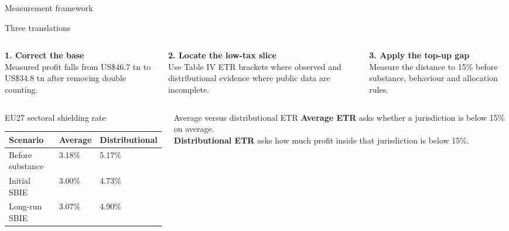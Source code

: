 \documentclass[aspectratio=169, 11pt]{beamer}
\newcommand{\USD}{US\$}
\begin{document}
\begin{frame}{Measurement framework}
\footnotesize
\vspace{-0.15em}
\begin{block}{Three translations}
\scriptsize
\begin{columns}[T,totalwidth=\linewidth]
\begin{column}{0.31\linewidth}
\textcolor{DkOrange}{\textbf{1. Correct the base}}\\[0.15em]
Measured profit falls from \USD46.7 tn to \USD34.8 tn after removing double counting.
\end{column}
\begin{column}{0.31\linewidth}
\textcolor{DkOrange}{\textbf{2. Locate the low-tax slice}}\\[0.15em]
Use Table IV ETR brackets where observed and distributional evidence where public data are incomplete.
\end{column}
\begin{column}{0.31\linewidth}
\textcolor{DkOrange}{\textbf{3. Apply the top-up gap}}\\[0.15em]
Measure the distance to 15\% before substance, behaviour and allocation rules.
\end{column}
\end{columns}
\end{block}

\vspace{0.35em}
\begin{columns}[T,onlytextwidth]
\begin{column}{0.53\textwidth}
\begin{block}{EU27 sectoral shielding rate}
\scriptsize
\centering
\setlength{\tabcolsep}{5pt}
\renewcommand{\arraystretch}{1.12}
\begin{tabular}{@{}L{2.85cm}C{1.25cm}C{1.75cm}@{}}
  \toprule
  Scenario & Average & Distributional \\
  \midrule
  Before substance & 3.18\% & 5.17\% \\
  Initial SBIE & 3.00\% & 4.73\% \\
  Long-run SBIE & 3.07\% & 4.90\% \\
  \bottomrule
\end{tabular}
\renewcommand{\arraystretch}{1}
\end{block}
\end{column}

\begin{column}{0.43\textwidth}
\begin{exampleblock}{Average versus distributional ETR}
\scriptsize
\textbf{Average ETR} asks whether a jurisdiction is below 15\% on average.\\[0.45em]
\textbf{Distributional ETR} asks how much profit inside that jurisdiction is below 15\%.
\end{exampleblock}
\end{column}
\end{columns}
\end{frame}
\end{document}
